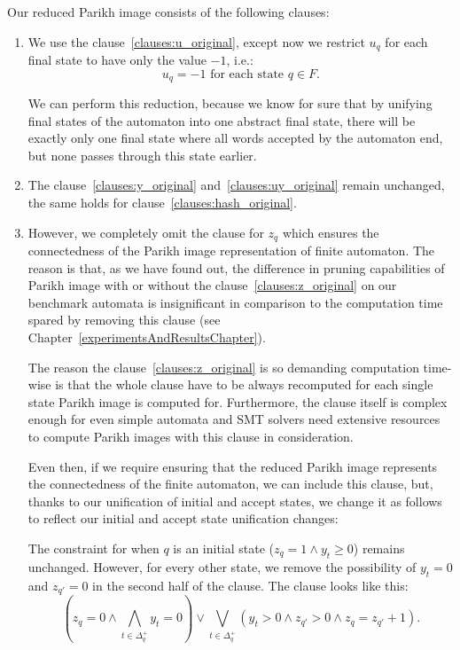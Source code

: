 Our reduced Parikh image consists of the following clauses:
\begin{enumerate}
    \item \label{clauses:u_reduced} We use the clause~\ref{clauses:u_original}, except now we restrict $u_q$ for each final state to have only the value $-1$, i.e.:
    $$ u_{q} = -1 \text{ for each state } q \in F \text{.}$$

    We can perform this reduction, because we know for sure that by unifying final states of the automaton into one abstract final state, there will be exactly only one final state where all words accepted by the automaton end, but none passes through this state earlier.

    \item \label{clauses:y_reduced} \label{clauses:uy_reduced} \label{clauses:hash_reduced} The clause~\ref{clauses:y_original} and~\ref{clauses:uy_original} remain unchanged, the same holds for clause~\ref{clauses:hash_original}.
    \item \label{clauses:z_reduced} However, we completely omit the clause for $z_{q}$ which ensures the connectedness of the Parikh image representation of finite automaton. The reason is that, as we have found out, the difference in pruning capabilities of Parikh image with or without the clause~\ref{clauses:z_original} on our benchmark automata is insignificant in comparison to the computation time spared by removing this clause (see Chapter~\ref{experimentsAndResultsChapter}).

    The reason the clause~\ref{clauses:z_original} is so demanding computation time-wise is that the whole clause have to be always recomputed for each single state Parikh image is computed for. Furthermore, the clause itself is complex enough for even simple automata and SMT solvers need extensive resources to compute Parikh images with this clause in consideration.

    Even then, if we require ensuring that the reduced Parikh image represents the connectedness of the finite automaton, we can include this clause, but, thanks to our unification of initial and accept states, we change it as follows to reflect our initial and accept state unification changes:

    The constraint for when $q$ is an initial state ($z_q = 1 \land y_t \geq 0$) remains unchanged. However, for every other state, we remove the possibility of $y_t = 0$ and $z_{q'} = 0$ in the second half of the clause. The clause looks like this:
    $$ (z_q = 0 \land \bigwedge_{t \in \Delta_q^+} y_t = 0) \lor \bigvee_{t \in \Delta_q^+} (y_t > 0 \land z_{q'} > 0 \land z_q = z_{q'} + 1) \text{.}$$
\end{enumerate}

